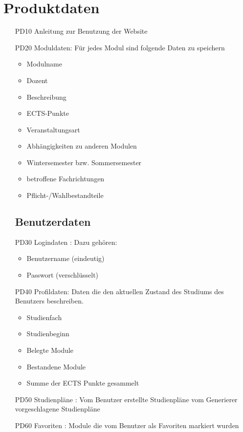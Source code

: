 \section{Produktdaten}
	\begin{itemize}[nosep]
	\subsection{Systemdaten}
	\item[PD10]Anleitung zur Benutzung der 		Website
	\item[PD20]Moduldaten: Für jedes Modul sind folgende Daten zu speichern	
	\begin{itemize}
	\item Modulname
	\item Dozent
	\item Beschreibung
	\item ECTS-Punkte
	\item Veranstaltungsart
	\item Abhängigkeiten zu anderen Modulen
	\item Wintersemester bzw. Sommersemester
	\item betroffene Fachrichtungen 
	\item Pflicht-/Wahlbestandteile
	\end{itemize}	 
	\subsection{Benutzerdaten}
	\label{subsec:product_data-benutzerdaten}
	\item[PD30]Logindaten : Dazu gehören:
		\begin{itemize}
		\item Benutzername (eindeutig)
		\item Passwort (verschlüsselt)
		\end{itemize}
	\item[PD40]Profildaten: Daten die den aktuellen Zustand des Studiums des Benutzers beschreiben.
		\begin{itemize}
		\item Studienfach
		\item Studienbeginn
		\item Belegte Module
		\item Bestandene Module 
		\item Summe der ECTS Punkte gesammelt
		\end{itemize}
\item[PD50]Studienpläne : 
	Vom Benutzer erstellte Studienpläne 
	vom Generierer vorgeschlagene Studienpläne 
\item[PD60] Favoriten : Module die vom Benutzer als Favoriten markiert wurden
\end{itemize}